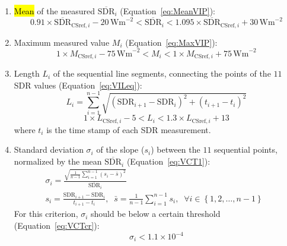 \documentclass[applsci,article,accept,moreauthors,pdftex]{Definitions/mdpi}
\providecommand{\tightlist}{%
  \setlength{\itemsep}{0pt}\setlength{\parskip}{0pt}}
\begin{document}
\begin{enumerate}
\def\labelenumi{(\alph{enumi})}
\tightlist
\item
  \hl{Mean} %
 of the measured \(\overline{\text{SDR}}_i\) (Equation~\eqref{eq:MeanVIP}): \begin{equation}
  0.91 \times \overline{\text{SDR}}_{\text{CSref},i} - 20\,\text{Wm}^{-2}
  < \overline{\text{SDR}}_i <
  1.095 \times \overline{\text{SDR}}_{\text{CSref},i} + 30\,\text{Wm}^{-2}
  \label{eq:MeanVIP}
  \end{equation}
\item
  Maximum measured value \(M_{i}\) (Equation~\eqref{eq:MaxVIP}):
  \begin{equation}
  1 \times M_{\text{CSref},i} - 75\,\text{Wm}^{-2}
  < M_{i} <
  1 \times M_{\text{CSref},i} + 75\,\text{Wm}^{-2}
  \label{eq:MaxVIP}
  \end{equation}
\item
  Length \(L_i\) of the sequential line segments, connecting the points
  of the \(11\) SDR values (Equation~\eqref{eq:VILeq}): \begin{equation}
  L_i = \sum_{i=1}^{n-1}\sqrt{\left ( \text{SDR}_{i+1} - \text{SDR}_{i}\right )^2 + \left ( t_{i+1} - t_i \right )^2}
  \label{eq:VILeq}
  \end{equation} \begin{equation}
  1 \times L_{\text{CSref},i} - 5 < L_i < 1.3 \times L_{\text{CSref},i} + 13
  \label{eq:VILcr}
  \end{equation} where \(t_i\) is the time stamp of each SDR
  measurement.
\item
  Standard deviation \(\sigma_i\) of the slope (\(s_i\)) between the
  \(11\) sequential points, normalized by the mean
  \(\overline{\text{SDR}}_i\) (Equation~\eqref{eq:VCT1}): \begin{gather}
    \sigma_i = \frac {\sqrt{\frac{1}{n-1} \sum_{i=1}^{n-1} \left( s_i - \bar{s} \right)^2}} {\overline{\text{SDR}}_i} \label{eq:VCT1} \\
    s_i = \frac{\text{SDR}_{i+1} - \text{SDR}_{i}}{t_{i+1} - t_i},\;\;   \bar{s} = \frac{1}{n-1} \sum_{i=1}^{n-1} s_i,\;\;\forall i \in \left \{ 1, 2, \ldots, n-1 \right \}\;\;
  \end{gather} For this criterion, \(\sigma_i\) should be below a
  certain threshold (Equation~\eqref{eq:VCTcr}): \begin{equation}
    \sigma_i < \ensuremath{1.1\times 10^{-4}} \label{eq:VCTcr}
  \end{equation}

\end{enumerate}
\end{document}
